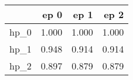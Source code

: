 \begin{tabular}{lrrr}
\toprule
{} &   ep 0 &   ep 1 &   ep 2 \\
\midrule
hp\_0 &  1.000 &  1.000 &  1.000 \\
hp\_1 &  0.948 &  0.914 &  0.914 \\
hp\_2 &  0.897 &  0.879 &  0.879 \\
\bottomrule
\end{tabular}
